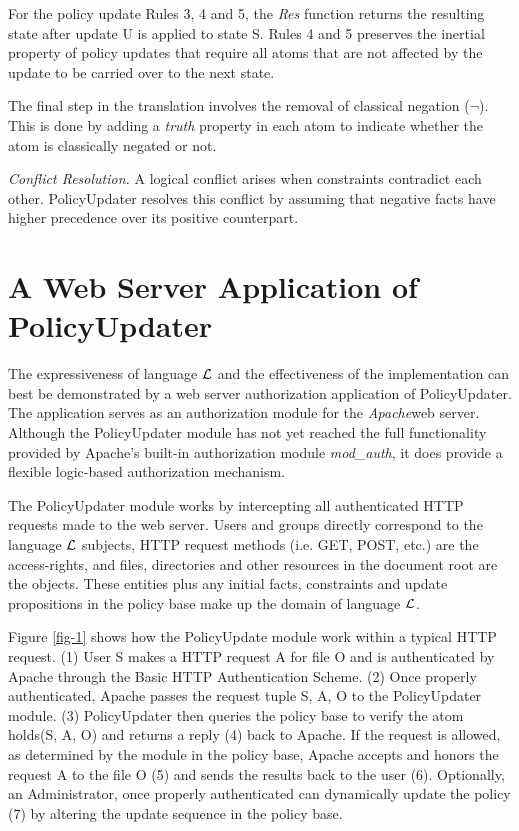 \documentclass{llncs}
\begin{document}
    For the policy update Rules 3, 4 and 5, the \emph{Res} function returns
    the resulting state after update U is applied to state S. Rules 4 and
    5 preserves the inertial property of policy updates that require all atoms
    that are not affected by the update to be carried over to the next state.

    The final step in the translation involves the removal of classical
    negation ($\lnot$). This is done by adding a \emph{truth} property
    in each atom to indicate whether the atom is classically negated or not.

    \vspace{0.05cm}

    \noindent
    \emph{Conflict Resolution.} A logical conflict arises when constraints
    contradict each other. PolicyUpdater resolves this conflict by assuming
    that negative facts have higher precedence over its positive counterpart.

  \section{A Web Server Application of PolicyUpdater}

    The expressiveness of language $\cal{L}$ and the effectiveness of the
    implementation can best be demonstrated by a web server authorization
    application of PolicyUpdater. The application serves as an authorization
    module for the \emph{Apache}\footnotemark web server. Although the
    PolicyUpdater module has not yet reached the full functionality provided
    by Apache's built-in authorization module \emph{mod\_auth}, it does provide
    a flexible logic-based authorization mechanism.

    The PolicyUpdater module works by intercepting all authenticated HTTP
    requests made to the web server. Users and groups directly correspond to
    the language $\cal{L}$ subjects, HTTP request methods (i.e. GET, POST,
    etc.) are the access-rights, and files, directories and other resources
    in the document root are the objects. These entities plus any initial
    facts, constraints and update propositions in the policy base make up the
    domain of language $\cal{L}$.

    Figure \ref{fig-1} shows how the PolicyUpdate module work within a typical
    HTTP request. (1) User S makes a HTTP request A for file O and is
    authenticated by Apache through the Basic HTTP Authentication Scheme. (2)
    Once properly authenticated, Apache passes the request tuple {S, A, O} to
    the PolicyUpdater module. (3) PolicyUpdater then queries the policy base
    to verify the atom holds(S, A, O) and returns a reply (4) back to Apache.
    If the request is allowed, as determined by the module in the policy base,
    Apache accepts and honors the request A to the file O (5) and sends the
    results back to the user (6). Optionally, an Administrator, once properly
    authenticated can dynamically update the policy (7) by altering the
    update sequence in the policy base.
\end{document}
